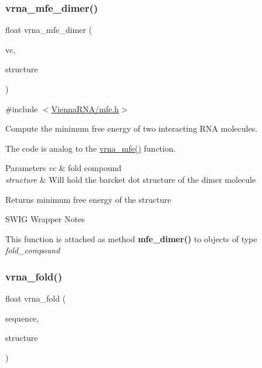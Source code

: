 \subsubsection{\texorpdfstring{vrna\+\_\+mfe\+\_\+dimer()}{vrna\_mfe\_dimer()}}
{\footnotesize\ttfamily float vrna\+\_\+mfe\+\_\+dimer (\begin{DoxyParamCaption}\item[{\hyperlink{group__fold__compound_ga1b0cef17fd40466cef5968eaeeff6166}{vrna\+\_\+fold\+\_\+compound\+\_\+t} $\ast$}]{vc,  }\item[{char $\ast$}]{structure }\end{DoxyParamCaption})}



{\ttfamily \#include $<$\hyperlink{mfe_8h}{Vienna\+R\+N\+A/mfe.\+h}$>$}



Compute the minimum free energy of two interacting R\+NA molecules. 

The code is analog to the \hyperlink{group__mfe__global_gabd3b147371ccf25c577f88bbbaf159fd}{vrna\+\_\+mfe()} function.


\begin{DoxyParams}{Parameters}
{\em vc} & fold compound \\
\hline
{\em structure} & Will hold the barcket dot structure of the dimer molecule \\
\hline
\end{DoxyParams}
\begin{DoxyReturn}{Returns}
minimum free energy of the structure
\end{DoxyReturn}
\begin{DoxyRefDesc}{S\+W\+I\+G Wrapper Notes}
\item[\hyperlink{wrappers__wrappers000081}{S\+W\+I\+G Wrapper Notes}]This function is attached as method {\bfseries mfe\+\_\+dimer()} to objects of type {\itshape fold\+\_\+compound} \end{DoxyRefDesc}
\mbox{\label{group__mfe__global_ga29a33b2895f4e67b0480271ff289afdc}} 
\subsubsection{\texorpdfstring{vrna\+\_\+fold()}{vrna\_fold()}}
{\footnotesize\ttfamily float vrna\+\_\+fold (\begin{DoxyParamCaption}\item[{const char $\ast$}]{sequence,  }\item[{char $\ast$}]{structure }\end{DoxyParamCaption})}



